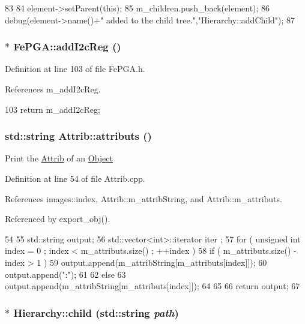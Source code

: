 \begin{DoxyCode}
83                                           {
84   element->setParent(this);
85   m_children.push_back(element);
86   debug(element->name()+" added to the child tree.","Hierarchy::addChild");
87 }
\end{DoxyCode}
\hypertarget{classFePGA_a64feabdb09e65b1b4b1376a4da713570}{
\subsubsection[{addI2cReg}]{$\ast$ FePGA::addI2cReg ()}}
\label{classFePGA_a64feabdb09e65b1b4b1376a4da713570}


Definition at line 103 of file FePGA.h.

References m\_\-addI2cReg.


\begin{DoxyCode}
103 { return m_addI2cReg;    }
\end{DoxyCode}
\hypertarget{classAttrib_aee7bbf16b144887f196e1341b24f8a26}{
\subsubsection[{attributs}]{\setlength{\rightskip}{0pt plus 5cm}std::string Attrib::attributs ()}}
\label{classAttrib_aee7bbf16b144887f196e1341b24f8a26}
Print the \hyperlink{classAttrib}{Attrib} of an \hyperlink{classObject}{Object} 

Definition at line 54 of file Attrib.cpp.

References images::index, Attrib::m\_\-attribString, and Attrib::m\_\-attributs.

Referenced by export\_\-obj().


\begin{DoxyCode}
54                             {
55   std::string output;
56   std::vector<int>::iterator iter ;
57   for ( unsigned int index = 0 ; index < m_attributs.size() ; ++index ) {
58     if ( m_attributs.size() - index > 1 ) {
59       output.append(m_attribString[m_attributs[index]]);
60       output.append(":");
61     }
62     else {
63       output.append(m_attribString[m_attributs[index]]);
64     }
65   }
66   return output;
67 }
\end{DoxyCode}
\hypertarget{classHierarchy_a1e207f973c694b538bf90107b4868817}{
\subsubsection[{child}]{ $\ast$ Hierarchy::child (std::string {\em path})}}
\label{classHierarchy_a1e207f973c694b538bf90107b4868817}


